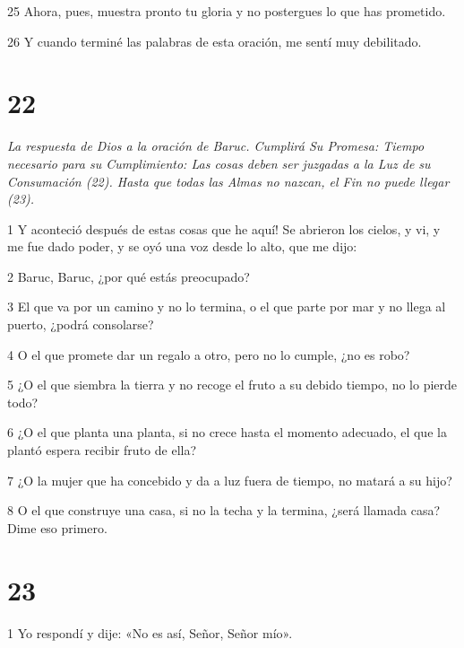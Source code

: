 \par 25 Ahora, pues, muestra pronto tu gloria y no postergues lo que has prometido.

\par 26 Y cuando terminé las palabras de esta oración, me sentí muy debilitado.

\chapter{22}

\par \textit{La respuesta de Dios a la oración de Baruc. Cumplirá Su Promesa: Tiempo necesario para su Cumplimiento: Las cosas deben ser juzgadas a la Luz de su Consumación (22). Hasta que todas las Almas no nazcan, el Fin no puede llegar (23).}

\par 1 Y aconteció después de estas cosas que he aquí! Se abrieron los cielos, y vi, y me fue dado poder, y se oyó una voz desde lo alto, que me dijo:

\par 2 Baruc, Baruc, ¿por qué estás preocupado?

\par 3 El que va por un camino y no lo termina, o el que parte por mar y no llega al puerto, ¿podrá consolarse?

\par 4 O el que promete dar un regalo a otro, pero no lo cumple, ¿no es robo?

\par 5 ¿O el que siembra la tierra y no recoge el fruto a su debido tiempo, no lo pierde todo?

\par 6 ¿O el que planta una planta, si no crece hasta el momento adecuado, el que la plantó espera recibir fruto de ella?

\par 7 ¿O la mujer que ha concebido y da a luz fuera de tiempo, no matará a su hijo?

\par 8 O el que construye una casa, si no la techa y la termina, ¿será llamada casa? Dime eso primero.

\chapter{23}

\par 1 Yo respondí y dije: «No es así, Señor, Señor mío».

